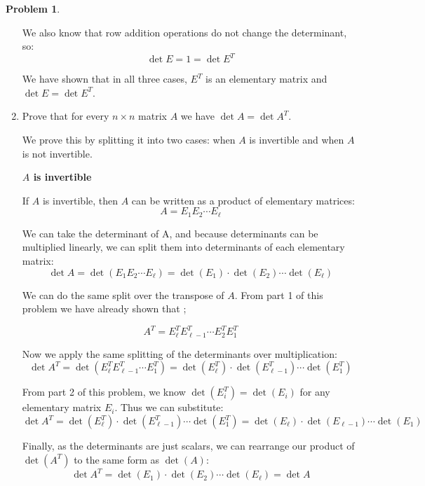 \documentclass[12pt, oneside]{amsart}
\theoremstyle{definition}
\newtheorem{prob}{Problem}
\begin{document}
\begin{prob}
\begin{enumerate}
\begin{solution}
    We also know that row addition operations do not change the determinant, so:
    \[
    \det E = 1 = \det E^T
    \]
    
    \vspace{0.3cm}
    
    We have shown that in all three cases, $E^T$ is an elementary matrix and $\det E = \det E^T$. 
    \end{solution}
    
    \item Prove that for every $n\times n$ matrix $A$ we have $\det A = \det A^T$.
    
    \begin{solution}
    We prove this by splitting it into two cases: when $A$ is invertible and when $A$ is not invertible.
    
    \vspace{0.3cm}
    
    \textbf{$A$ is invertible}
    
    If $A$ is invertible, then $A$ can be written as a product of elementary matrices:
    \[
    A = E_1 E_2 \cdots E_\ell
    \]
    
    We can take the determinant of A, and because determinants can be multiplied linearly, we can split them into determinants of each elementary matrix:
    \[
    \det A = \det(E_1 E_2 \cdots E_\ell) = \det(E_1) \cdot \det(E_2) \cdots \det(E_\ell)
    \]
    
    We can do the same split over the transpose of $A$. From part 1 of this problem we have already shown that ;
    
    \[A^T = E_\ell^T E_{\ell-1}^T \cdots E_2^T E_1^T\]
    
    Now we apply the same splitting of the determinants over multiplication:
    \[
    \det A^T = \det(E_\ell^T E_{\ell-1}^T \cdots E_1^T) = \det(E_\ell^T) \cdot \det(E_{\ell-1}^T) \cdots \det(E_1^T)
    \]
    
    From part 2 of this problem, we know $\det(E_i^T) = \det(E_i)$ for any elementary matrix $E_i$. Thus we can substitute:
    \[
    \det A^T = \det(E_\ell^T) \cdot \det(E_{\ell-1}^T) \cdots \det(E_1^T) = \det(E_\ell) \cdot \det(E_{\ell-1}) \cdots \det(E_1)
    \]
    
    Finally, as the determinants are just scalars, we can rearrange our product of $\det(A^T)$ to the same form as $\det(A)$:
    \[
    \det A^T = \det(E_1) \cdot \det(E_2) \cdots \det(E_\ell) = \det A
    \]
    
    \vspace{0.3cm}
    

\end{solution}
\end{enumerate}
\end{prob}
\end{document}
